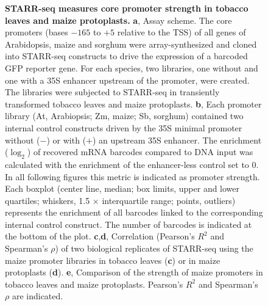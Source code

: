 \documentclass[10pt, english]{article}
\newcommand{\fignormal}{\scriptsize}
\newcommand{\titleend}{ }
\newcommand{\nextentry}{ }
\newif\ifmain
\newcounter{fig}
\newenvironment{fig}{%
	\begin{figure}%
		\stepcounter{fig}%
		\pdfbookmark{\figurename\ \thefig}{figure\thefig}
		\tikzsetnextfilename{figure\thefig}%
		\fignormal%
		\centering%
}{%
	\end{figure}%
	\clearpage
}
\newif\ifsubfigupper
\newcounter{subfig}[figure]
\newcommand{\plainsubfigref}[1]{\textbf{\ifsubfigupper\uppercase{#1}\else\lowercase{#1}\fi}}
\newcommand{\subfigref}[1]{\textbf{\plainsubfigref{#1}},}
\newcommand{\parensubfig}[2][]{(#1\textbf{\plainsubfigref{#2}})}
\begin{document}
	\sffamily
	\frenchspacing
	
	\renewcommand{\figurename}{Fig.}
	
	
	\ifmain
		
		\begin{fig}
			\tikzset{jpeg export = 600}%
			\caption{%
				\textbf{STARR-seq measures core promoter strength in tobacco leaves and maize protoplasts.}\titleend
				\subfigref{A} Assay scheme. The core promoters (bases $-165$ to $+5$ relative to the TSS) of all genes of Arabidopsis, maize and sorghum were array-synthesized and cloned into STARR-seq constructs to drive the expression of a barcoded GFP reporter gene. For each species, two libraries, one without and one with a 35S enhancer upstream of the promoter, were created. The libraries were subjected to STARR-seq in transiently transformed tobacco leaves and maize protoplasts.\nextentry
				\subfigref{B} Each promoter library (At, Arabiopsis; Zm, maize; Sb, sorghum) contained two internal control constructs driven by the 35S minimal promoter without ($-$) or with ($+$) an upstream 35S enhancer. The enrichment ($\log_2$) of recovered mRNA barcodes compared to DNA input was calculated with the enrichment of the enhancer-less control set to 0. In all following figures this metric is indicated as promoter strength. Each boxplot (center line, median; box limits, upper and lower quartiles; whiskers, 1.5 $\times$ interquartile range; points, outliers) represents the enrichment of all barcodes linked to the corresponding internal control construct. The number of barcodes is indicated at the bottom of the plot.\nextentry
				\subfigref{C}\subfigref{D} Correlation (Pearson's $R^2$ and Spearman's $\rho$) of two biological replicates of STARR-seq using the maize promoter libraries in tobacco leaves \parensubfig{C} or in maize protoplasts \parensubfig{D}.\nextentry
				\subfigref{E} Comparison of the strength of maize promoters in tobacco leaves and maize protoplasts. Pearson's $R^2$ and Spearman's $\rho$ are indicated.
			}%
			\label{fig:overview}%
		\end{fig}
		
\end{document}
